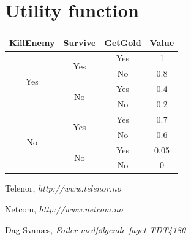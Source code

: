 \documentclass[titlepage]{article}
\begin{document}
\newpage

\section{Utility function}

\begin{tabular}{ |c|c|c|c| }

\hline
KillEnemy & Survive & GetGold & Value \\ \hline
\multirow{4}{*}{Yes} & \multirow{2}{*}{Yes} & Yes & 1 \\ \cline{3-4}
 & & No & 0.8 \\ \cline{2-4}
 & \multirow{2}{*}{No} & Yes & 0.4 \\ \cline{3-4}
 & & No & 0.2 \\ \hline

 \multirow{4}{*}{No} & \multirow{2}{*}{Yes} & Yes & 0.7 \\ \cline{3-4}
 & & No & 0.6 \\ \cline{2-4}
 & \multirow{2}{*}{No} & Yes & 0.05 \\ \cline{3-4}
 & & No & 0 \\ \hline

\end{tabular}


\begin{thebibliography}{9}

	Telenor,
	\emph{http://www.telenor.no}

	Netcom,
	\emph{http://www.netcom.no}

	Dag Svanæs,
	\emph{Foiler medfølgende faget TDT4180}
\end{thebibliography}
\end{document}
